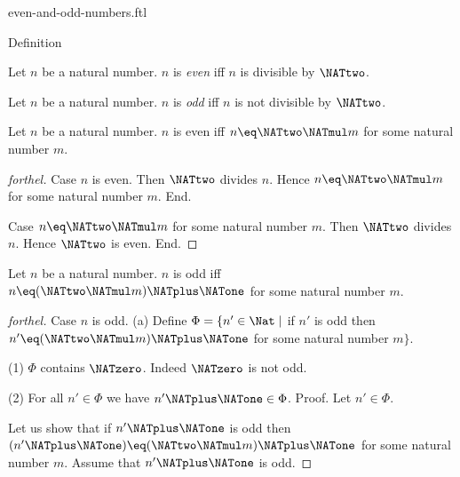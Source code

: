 \documentclass{naproche-library}
\begin{document}
\begin{smodule}[title=Even and Odd Numbers]{even-and-odd-numbers.ftl}

\begin{sfragment}{Definition}
  \begin{definition}[forthel,id=ARITHMETIC_15_4521358965847512]
    Let $n$ be a natural number.
    $n$ is \emph{even} iff $n$ is divisible by $\NATtwo$.
  \end{definition}

  \begin{definition}[forthel,id=ARITHMETIC_15_1023652125874596]
    Let $n$ be a natural number.
    $n$ is \emph{odd} iff $n$ is not divisible by $\NATtwo$.
  \end{definition}

  \begin{proposition}[forthel,id=ARITHMETIC_15_0236985458752156]
    Let $n$ be a natural number.
    $n$ is even iff $n \eq \NATtwo \NATmul m$ for some natural number $m$.
  \end{proposition}
  \begin{proof}[forthel]
    Case $n$ is even.
      Then $\NATtwo$ divides $n$.
      Hence $n \eq \NATtwo \NATmul m$ for some natural number $m$.
    End.

    Case $n \eq \NATtwo \NATmul m$ for some natural number $m$.
      Then $\NATtwo$ divides $n$.
      Hence $\NATtwo$ is even.
    End.
  \end{proof}

  \begin{proposition}[forthel,id=ARITHMETIC_15_1023512547854265]
    Let $n$ be a natural number.
    $n$ is odd iff $n \eq (\NATtwo \NATmul m) \NATplus \NATone$ for some natural number $m$.
  \end{proposition}
  \begin{proof}[forthel]
    Case $n$ is odd.
      (a) Define $\Phi = \{ n' \in \Nat \mid$ if $n'$ is odd then $n' \eq (\NATtwo \NATmul m) \NATplus \NATone$ for some natural number $m \}$.

      (1) $\Phi$ contains $\NATzero$.
      Indeed $\NATzero$ is not odd.

      (2) For all $n' \in \Phi$ we have $n' \NATplus \NATone \in \Phi$. \newline
      Proof.
        Let $n' \in \Phi$.

        Let us show that if $n' \NATplus  \NATone$ is odd then $(n' \NATplus  \NATone) \eq (\NATtwo \NATmul m) \NATplus  \NATone$ for some natural number $m$.
          Assume that $n' \NATplus  \NATone$ is odd.


\end{proof}
\end{sfragment}
\end{smodule}
\end{document}

